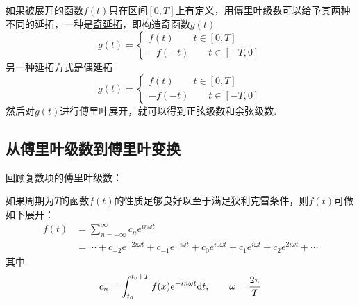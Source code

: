 \documentclass[UTF8]{ctexart}
\newcommand{\trm}[1]{{\rm #1}}
\newenvironment{theorem}[1]
    {\begin{tcolorbox}[enhanced, colback=LightYellow, breakable=true, frame hidden, borderline west={1.5mm}{-2mm}{DarkBlue}]
    {\bfseries {\color{DarkBlue} 定理}\quad #1} \newline}
    {\end{tcolorbox}}
\newenvironment{reference}
    {\begin{tcolorbox}[enhanced, colback=GhostWhite, breakable=true, frame hidden, borderline west={1.5mm}{-2mm}{Gray}]}
    {\end{tcolorbox}}
\begin{document}
如果被展开的函数\(f(t)\)只在区间\([0,T]\)上有定义，用傅里叶级数可以给予其两种不同的延拓，一种是\uline{奇延拓}，即构造奇函数\(g(t)\)
\[g(t)=\begin{cases} f(t) \qquad t\in[0,T] \\ -f(-t) \qquad t \in [-T,0]\end{cases}\]
另一种延拓方式是\uline{偶延拓}
\[g(t)=\begin{cases} f(t) \qquad t\in[0,T] \\ -f(-t) \qquad t \in [-T,0]\end{cases}\]
然后对\(g(t)\)进行傅里叶展开，就可以得到正弦级数和余弦级数.


\subsection{从傅里叶级数到傅里叶变换}

回顾复数项的傅里叶级数：
\begin{reference}
    如果周期为\(T\)的函数\(f(t)\)的性质足够良好以至于满足狄利克雷条件，则\(f(t)\)可做如下展开：
    \begin{align*}
        f(t) &= \sum_{n=-\infty}^{\infty}c_ne^{in\omega t} \\
        &= \cdots + c_{-2}e^{-2i\omega t} + c_{-1}e^{-i\omega t} + c_{0}e^{i0\omega t} + c_{1}e^{i\omega t} + c_{2}e^{2i\omega t} + \cdots
    \end{align*}
    其中
    \[c_n=\int_{t_0}^{t_0+T}f(x)e^{-in\omega t}\trm{d}t, \qquad \omega=\frac{2\pi}{T}\]
\end{reference}
\end{document}
